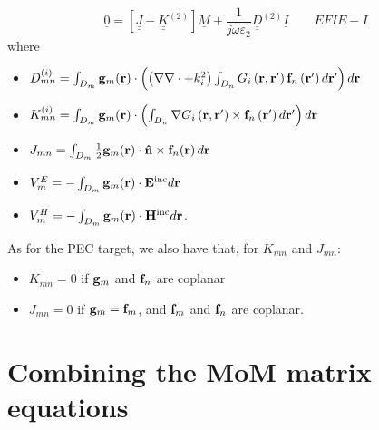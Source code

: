 \begin{equation}\label{eqn:Matrix EFIE-I}
\boxed{\underline{0} =  \left[\underline{\underline{J}} - \underline{\underline{K}}^{(2)} \right] \underline{M} + \frac{1}{j \omega \varepsilon_2}  \underline{\underline{D}}^{(2)} \underline{I} } \qquad EFIE-I 
\end{equation}
where
\begin{itemize}
\item $D_{mn}^{(i)} = \int_{D_m}\mathbf{g}_m \!\left(\mathbf{r}\right) \cdot \left( \left(\nabla \nabla \cdot + k_i^2\right) \int_{D_n} G_i\left(\mathbf{r}, \mathbf{r}'\right) \mathbf{f}_n\left(\mathbf{r}'\right) d\mathbf{r}' \right) d\mathbf{r}$
\item $K_{mn}^{(i)} = \int_{D_m} \mathbf{g}_m \!\left(\mathbf{r}\right) \cdot \left(\int_{D_n} \nabla G_i\left(\mathbf{r}, \mathbf{r}'\right) \times \mathbf{f}_n\left(\mathbf{r}'\right) d\mathbf{r}'\right) d\mathbf{r}$
\item $J_{mn} = \int_{D_m} \frac{1}{2} \mathbf{g}_m \!\left(\mathbf{r}\right) \cdot \mathbf{\hat{n}} \times \mathbf{f}_{n}\!\left(\mathbf{r}\right)d\mathbf{r}$
\item $V_m^{E} = -\int_{D_m}\mathbf{g}_m \!\left(\mathbf{r}\right) \cdot \mathbf{E}^\text{inc} d\mathbf{r}$
\item $V_m^{H} = -\int_{D_m}\mathbf{g}_m \!\left(\mathbf{r}\right) \cdot \mathbf{H}^\text{inc} d\mathbf{r}$.
\end{itemize}
%
\par
As for the PEC target, we also have that, for $K_{mn}$ and $J_{mn}$:
\begin{itemize}
\item $K_{mn} = 0$ if $\mathbf{g}_m$ and $\mathbf{f}_n$ are coplanar
\item $J_{mn} = 0$ if $\mathbf{g}_m = \mathbf{f}_m$, and $\mathbf{f}_m$ and $\mathbf{f}_n$ are coplanar.
\end{itemize}

\section{Combining the MoM matrix equations}
%
\par

